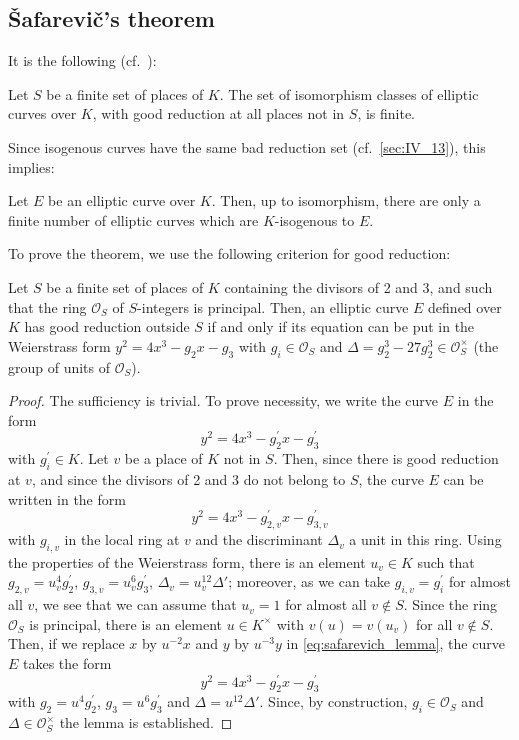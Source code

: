 \subsection{\v Safarevi\v c's theorem}%
\label{sec:IV_14}
\dpage
It is the following (cf.\ \cite{23}):
\begin{thm}
Let $S$ be a finite set of places of $K$. The set of isomorphism classes of
elliptic curves over $K$, with good reduction at all places not in $S$, is
finite.
\end{thm}
Since isogenous curves have the same bad reduction set (cf.\ \ref{sec:IV_13}),
this implies:
\begin{cor}
Let $E$ be an elliptic curve over $K$. Then, up to isomorphism, there are only
a finite number of elliptic curves which are $K$-isogenous to $E$.
\end{cor}

To prove the theorem, we use the following criterion for good reduction:
\begin{lem}
Let $S$ be a finite set of places of $K$ containing the divisors of 2 and 3,
and such that the ring $\mathcal{O}_S$ of $S$-integers is principal. Then, an
elliptic curve $E$ defined over $K$ has good reduction outside $S$ if and only
if its equation can be put in the Weierstrass form $y^2 = 4x^3 - g_2 x - g_3$
with $g_i \in \mathcal{O}_S$ and $\Delta = g_2^3 - 27 g_2^3 \in
\mathcal{O}_S^\times$ (the group of units of $\mathcal{O}_S$).
\end{lem}

\begin{proof}
The sufficiency is trivial. To prove necessity, we write the
curve $E$ in the form
\begin{equation}
	y^2 = 4x^3 - g_2^\prime x - g_3^\prime
	\tag{$*$}
	\label{eq:safarevich_lemma}
\end{equation}
with $g_i^\prime \in K$. Let $v$ be a place of $K$ not in $S$. Then, since
there is good reduction at $v$, and since the divisors of 2 and 3 do not belong
\dpage
to $S$, the curve $E$ can be written in the form
\[
	y^2 = 4x^3 - g_{2, v}^\prime x - g_{3, v}^\prime
\]
with $g_{i, v}$ in the local ring at $v$ and the discriminant $\Delta_v$ a unit
in this ring. Using the properties of the Weierstrass form, there is an element
$u_v \in K$ such that $g_{2, v} = u_v^4 g^\prime_2$, $g_{3, v} = u_v^6
g^\prime_3$, $\Delta_v = u_v^{12} \Delta'$;\label{errata:uv12} moreover, as we
can take $g_{i,v} = g_i^\prime$ for almost all $v$, we see that we can assume
that $u_v = 1$ for almost all $v \notin S$. Since the ring $\mathcal{O}_S$ is
principal, there is an element $u \in K^\times$ with $v(u) = v(u_v)$ for all $v
\notin S$. Then, if we replace $x$ by $u^{-2} x$ and $y$ by $u^{-3} y$ in
\eqref{eq:safarevich_lemma}, the curve $E$ takes the form
\[
	y^2 = 4x^3 - g_2^\prime x - g_3^\prime
\]
with $g_2 = u^4 g^\prime_2$, $g_3 = u^6 g^\prime_3$ and $\Delta = u^{12}
\Delta'$. Since, by construction, $g_i \in \mathcal{O}_S$ and $\Delta \in
\mathcal{O}_S^\times$ the lemma is established.
\end{proof}

